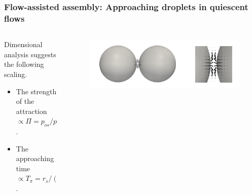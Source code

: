 \begin{frame}[t]
  \frametitle{Flow-assisted assembly: Approaching droplets in quiescent flows}

  \begin{columns}[T]
    \begin{column}{0.55\textwidth}
      Dimensional analysis suggests the following scaling.  \vskip0.2cm
      \begin{itemize}
      \item The strength of the attraction $\propto \Pi=p_{os}/p$.
      \item The approaching time $\propto T_\pi = r_s/(R\Pi)$.
      \end{itemize}
    \end{column}

    \begin{column}{0.4\textwidth}
      \begin{figure}
        \includegraphics[width=\columnwidth]{../paper2/figs/depletion_flow.png}
      \end{figure}

    \end{column}
    
  \end{columns}


\end{frame}

